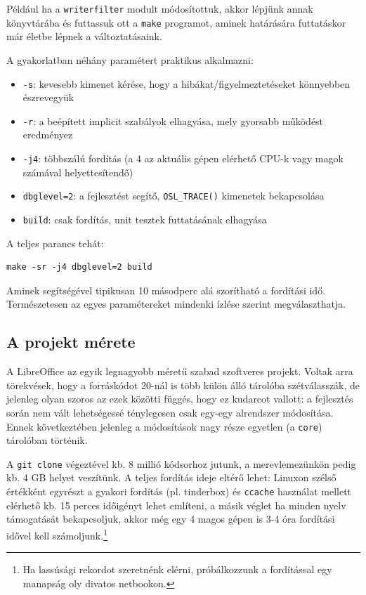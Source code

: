 \documentclass[a4paper]{report}
\begin{document}
Például ha a \texttt{writerfilter} modult módosítottuk, akkor lépjünk annak
könyvtárába és futtassuk ott a \texttt{make} programot, aminek határására
futtatáskor már életbe lépnek a változtatásaink.

A gyakorlatban néhány paramétert praktikus alkalmazni:

\begin{itemize}
\item \texttt{-s}: kevesebb kimenet kérése, hogy a hibákat/figyelmeztetéseket könnyebben észrevegyük

\item \texttt{-r}: a beépített implicit szabályok elhagyása, mely gyorsabb működést eredményez

\item \texttt{-j4}: többszálú fordítás (a 4 az aktuális gépen elérhető CPU-k vagy magok számával helyettesítendő)

\item \texttt{dbglevel=2}: a fejlesztést segítő, \texttt{OSL\_TRACE()} kimenetek bekapcsolása

\item \texttt{build}: csak fordítás, unit tesztek futtatásának elhagyása
\end{itemize}

A teljes parancs tehát:

\begin{verbatim}
make -sr -j4 dbglevel=2 build
\end{verbatim}

Aminek segítségével tipikusan 10 másodperc alá szorítható a fordítási idő.
Természetesen az egyes paramétereket mindenki ízlése szerint megválaszthatja.

\subsection*{A projekt mérete}

A LibreOffice az egyik legnagyobb méretű szabad szoftveres projekt. Voltak arra
törekvések, hogy a forráskódot 20-nál is több külön álló tárolóba szétválasszák, de
jelenleg olyan szoros az ezek közötti függés, hogy ez kudarcot vallott: a
fejlesztés során nem vált lehetségessé ténylegesen csak egy-egy alrendszer
módosítása. Ennek következtében jelenleg a módosítások nagy része egyetlen (a \texttt{core})
tárolóban történik.

A \texttt{git clone} végeztével kb. 8 millió kódsorhoz jutunk, a
merevlemezünkön pedig kb. 4 GB helyet veszítünk. A teljes fordítás ideje eltérő
lehet: Linuxon szélső értékként egyrészt a gyakori fordítás (pl. tinderbox) és
\texttt{ccache} használat mellett elérhető kb. 15 perces időigényt lehet
említeni, a másik véglet ha minden nyelv támogatását bekapcsoljuk, akkor még
egy 4 magos gépen is 3-4 óra fordítási idővel kell számoljunk.\footnote{Ha
lassúsági rekordot szeretnénk elérni, próbálkozzunk a fordítással egy manapság
oly divatos netbookon.}
\end{document}
